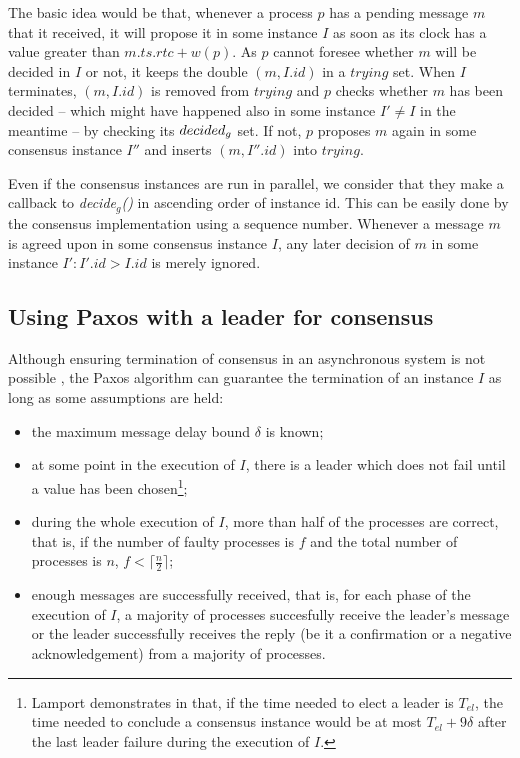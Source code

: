 \documentclass[times, 10pt]{article}
\begin{document}
The basic idea would be that, whenever a process $p$ has a pending message $m$ that it received, it will propose it in some instance $I$ as soon as its clock has a value greater than $m.ts.rtc + w(p)$. As $p$ cannot foresee whether $m$ will be decided in $I$ or not, it keeps the double $(m,I.id)$ in a $trying$ set. When $I$ terminates, $(m,I.id)$ is removed from $trying$ and $p$ checks whether $m$ has been decided -- which might have happened also in some instance $I' \neq I$ in the meantime -- by checking its $decided\text{$_g$}$ set. If not, $p$ proposes $m$ again in some consensus instance $I''$ and inserts $(m,I''.id)$ into $trying$.

Even if the consensus instances are run in parallel, we consider that they make a callback to \emph{decide$_g$()} in ascending order of instance id. This can be easily done by the consensus implementation using a sequence number. Whenever a message $m$ is agreed upon in some consensus instance $I$, any later decision of $m$ in some instance \mbox{$I' : I'.id > I.id$} is merely ignored.



\subsection{Using Paxos with a leader for consensus}
\label{sec:paxos}

Although ensuring termination of consensus in an asynchronous system is not possible \cite{fischer1985idc}, the Paxos \cite{lamport1998ptp} algorithm can guarantee the termination of an instance $I$ as long as some assumptions are held:

\begin{itemize}
  \item the maximum message delay bound $\delta$ is known;
  \item at some point in the execution of $I$, there is a leader which does not fail until a value has been chosen\footnote{Lamport demonstrates in \cite{lamport1998ptp} that, if the time needed to elect a leader is $T_{el}$, the time needed to conclude a consensus instance would be at most $T_{el} + 9\delta$ after the last leader failure during the execution of $I$.};
  \item during the whole execution of $I$, more than half of the processes are correct, that is, if the number of faulty processes is $f$ and the total number of processes is $n$, $f < \lceil \frac{n}{2} \rceil$;
  \item enough messages are successfully received, that is, for each phase of the execution of $I$, a majority of processes succesfully receive the leader's message or the leader successfully receives the reply (be it a confirmation or a negative acknowledgement) from a majority of processes.
\end{itemize}
\end{document}
